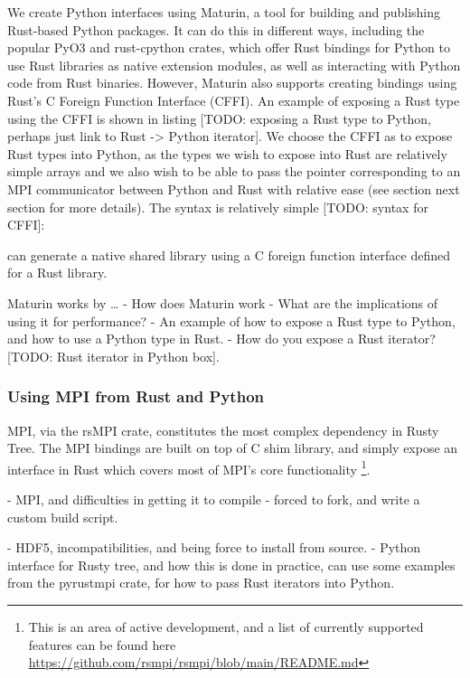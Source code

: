 We create Python interfaces using Maturin, a tool for building and publishing Rust-based Python packages. It can do this in different ways, including the popular PyO3 \cite{pyo32022github} and rust-cpython \cite{rustcpython2022github} crates, which offer Rust bindings for Python to use Rust libraries as native extension modules, as well as interacting with Python code from Rust binaries. However, Maturin also supports creating bindings using Rust's C Foreign Function Interface (CFFI). An example of exposing a Rust type using the CFFI is shown in listing [TODO: exposing a Rust type to Python, perhaps just link to Rust -> Python iterator]. We choose the CFFI as to expose Rust types into Python, as the types we wish to expose into Rust are relatively simple arrays and we also wish to be able to pass the pointer corresponding to an MPI communicator between Python and Rust with relative ease (see section next section for more details). The syntax is relatively simple [TODO: syntax for CFFI]:



can generate a native shared library using a C foreign function interface defined for a Rust library.

Maturin works by \dots
- How does Maturin work
- What are the implications of using it for performance?
- An example of how to expose a Rust type to Python, and how to use a Python type in Rust.
- How do you expose a Rust iterator? [TODO: Rust iterator in Python box].

\subsubsection*{Using MPI from Rust and Python}

MPI, via the rsMPI crate, constitutes the most complex dependency in Rusty Tree. The MPI bindings are built on top of C shim library, and simply expose an interface in Rust which covers most of MPI's core functionality \footnote{This is an area of active development, and a list of currently supported features can be found here \url{https://github.com/rsmpi/rsmpi/blob/main/README.md}}. 

- MPI, and difficulties in getting it to compile
    - forced to fork, and write a custom build script.

- HDF5, incompatibilities, and being force to install from source.
- Python interface for Rusty tree, and how this is done in practice, can use some examples from the pyrustmpi crate, for how to pass Rust iterators into Python.

